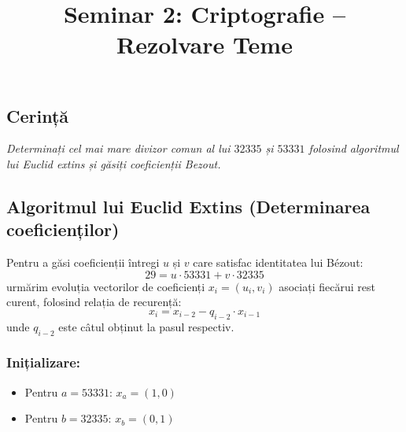 \documentclass[12pt]{article}
\title{Seminar 2: Criptografie -- Rezolvare Teme}
\author{}
\date{} %
\begin{document}
\maketitle


\subsection*{Cerință}
\textit{Determinați cel mai mare divizor comun al lui $32335$ și $53331$ folosind algoritmul lui Euclid extins și găsiți coeficienții Bezout.}


\subsection*{Algoritmul lui Euclid Extins (Determinarea coeficienților)}
Pentru a găsi coeficienții întregi $u$ și $v$ care satisfac identitatea lui Bézout:
\[
29 = u \cdot 53331 + v \cdot 32335
\]
urmărim evoluția vectorilor de coeficienți $x_i = (u_i, v_i)$ asociați fiecărui rest curent, folosind relația de recurență:
\[
x_{i} = x_{i-2} - q_{i-2} \cdot x_{i-1}
\]
unde $q_{i-2}$ este câtul obținut la pasul respectiv.

\subsubsection*{Inițializare:}
\begin{itemize}
    \item Pentru $a = 53331$: \quad $x_a = (1, 0)$
    \item Pentru $b = 32335$: \quad $x_b = (0, 1)$
\end{itemize}
\end{document}
